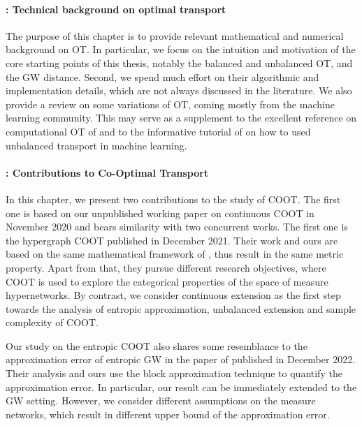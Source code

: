 \paragraph{ : Technical background on optimal transport}

The purpose of this chapter is to provide relevant mathematical and numerical background
on OT. In particular, we focus on the intuition and motivation of the core starting points
of this thesis, notably the balanced and unbalanced OT, and the GW distance.
Second, we spend much effort on their algorithmic and implementation details, which are not
always discussed in the literature. We also provide a review on some variations of OT,
coming mostly from the machine learning community. This may serve as a supplement
to the excellent reference on computational OT of \citet{Peyre19} and to the informative
tutorial of \citet{Sejourne22} on how to used unbalanced transport in machine learning.

\paragraph{: Contributions to Co-Optimal Transport}

In this chapter, we present two contributions to the study of COOT.
The first one is based on our unpublished working paper
on continuous COOT in November 2020 and bears similarity with two concurrent works.
The first one is the hypergraph COOT \citep{Chowdhury21b} published in December 2021.
Their work and ours are based on the same mathematical framework of \citet{Chowdhury19},
thus result in the same metric property. Apart from that, they pursue different research objectives,
where COOT is used to explore the categorical properties of the space of measure hypernetworks.
By contrast, we consider continuous extension as the first step towards the analysis of
entropic approximation, unbalanced extension and sample complexity of COOT.

Our study on the entropic COOT also shares some resemblance to the approximation error of
entropic GW in the paper of \citet{Zhang23} published in December 2022.
Their analysis and ours use the block approximation technique \citep{Carlier17}
to quantify the approximation error.
In particular, our result can be immediately extended to the GW setting. However,
we consider different assumptions on the measure networks,
which result in different upper bound of the approximation error.

